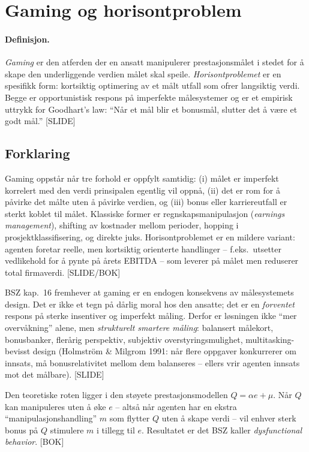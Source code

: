 \section{Gaming og horisontproblem}\label{thr:gaming-in-performance-measurement}

\paragraph{Definisjon.} \emph{Gaming} er den atferden der en ansatt manipulerer prestasjonsmålet i stedet for å skape den underliggende verdien målet skal speile. \emph{Horisontproblemet} er en spesifikk form: kortsiktig optimering av et målt utfall som ofrer langsiktig verdi. Begge er opportunistisk respons på imperfekte målesystemer og er et empirisk uttrykk for Goodhart's law: ``Når et mål blir et bonusmål, slutter det å være et godt mål.'' [SLIDE]

\subsection*{Forklaring}

Gaming oppstår når tre forhold er oppfylt samtidig: (i) målet er imperfekt korrelert med den verdi prinsipalen egentlig vil oppnå, (ii) det er rom for å påvirke det målte uten å påvirke verdien, og (iii) bonus eller karriereutfall er sterkt koblet til målet. Klassiske former er regnskapsmanipulasjon (\emph{earnings management}), shifting av kostnader mellom perioder, hopping i prosjektklassifisering, og direkte juks. Horisontproblemet er en mildere variant: agenten foretar reelle, men kortsiktig orienterte handlinger -- f.eks.\ utsetter vedlikehold for å pynte på årets EBITDA -- som leverer på målet men reduserer total firmaverdi. [SLIDE/BOK]

BSZ kap.\ 16 fremhever at gaming er en endogen konsekvens av målesystemets design. Det er ikke et tegn på dårlig moral hos den ansatte; det er en \emph{forventet} respons på sterke insentiver og imperfekt måling. Derfor er løsningen ikke ``mer overvåkning'' alene, men \emph{strukturelt smartere måling}: balansert målekort, bonusbanker, flerårig perspektiv, subjektiv overstyringsmulighet, multitasking-bevisst design (Holmström \& Milgrom 1991: når flere oppgaver konkurrerer om innsats, må bonusrelativitet mellom dem balanseres -- ellers vrir agenten innsats mot det målbare). [SLIDE]

Den teoretiske roten ligger i den støyete prestasjonsmodellen $Q = \alpha e + \mu$. Når $Q$ kan manipuleres uten å øke $e$ -- altså når agenten har en ekstra ``manipulasjonshandling'' $m$ som flytter $Q$ uten å skape verdi -- vil enhver sterk bonus på $Q$ stimulere $m$ i tillegg til $e$. Resultatet er det BSZ kaller \emph{dysfunctional behavior}. [BOK]

